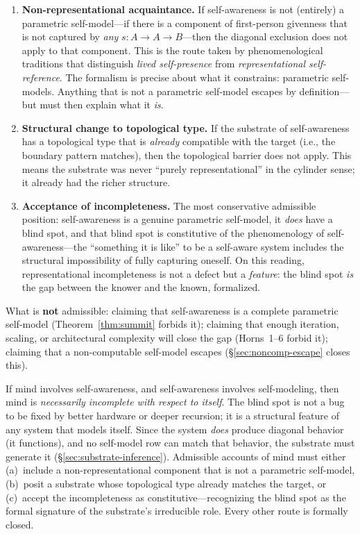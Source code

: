 \documentclass[11pt]{article}
\begin{document}
\begin{enumerate}[label=(\alph*),itemsep=0.3ex]
\item \textbf{Non-representational acquaintance.}
  If self-awareness is not (entirely) a parametric self-model---if
  there is a component of first-person givenness that is not captured
  by \emph{any} $s : A \to A \to B$---then the diagonal exclusion does
  not apply to that component.  This is the route taken by
  phenomenological traditions that distinguish \emph{lived
  self-presence} from \emph{representational self-reference}.  The
  formalism is precise about what it constrains: parametric
  self-models.  Anything that is not a parametric self-model escapes
  by definition---but must then explain what it \emph{is}.
\item \textbf{Structural change to topological type.}
  If the substrate of self-awareness has a topological type that is
  \emph{already} compatible with the target (i.e., the boundary
  pattern matches), then the topological barrier does not apply.  This
  means the substrate was never ``purely representational'' in the
  cylinder sense; it already had the richer structure.
\item \textbf{Acceptance of incompleteness.}
  The most conservative admissible position: self-awareness is a
  genuine parametric self-model, it \emph{does} have a blind spot, and
  that blind spot is constitutive of the phenomenology of
  self-awareness---the ``something it is like'' to be a self-aware
  system includes the structural impossibility of fully capturing
  oneself.  On this reading, representational incompleteness is not a
  defect but a \emph{feature}: the blind spot \emph{is} the gap
  between the knower and the known, formalized.
\end{enumerate}

\noindent
What is \textbf{not} admissible: claiming that self-awareness is a
complete parametric self-model (Theorem~\ref{thm:summit} forbids it);
claiming that enough iteration, scaling, or architectural complexity
will close the gap (Horns~1--6 forbid it); claiming that a
non-computable self-model escapes (\S\ref{sec:noncomp-escape} closes
this).

\begin{keybox}[title={What is mind, given the obstructions?}]
If mind involves self-awareness, and self-awareness involves
self-modeling, then mind is \emph{necessarily incomplete with respect
to itself}.  The blind spot is not a bug to be fixed by better
hardware or deeper recursion; it is a structural feature of any
system that models itself.  Since the system \emph{does} produce
diagonal behavior (it functions), and no self-model row can match
that behavior, the substrate must generate it
(\S\ref{sec:substrate-inference}).  Admissible accounts of mind
must either (a)~include a non-representational component that is
not a parametric self-model, (b)~posit a substrate whose topological
type already matches the target, or (c)~accept the incompleteness as
constitutive---recognizing the blind spot as the formal signature of
the substrate's irreducible role.  Every other route is formally
closed.
\end{keybox}
\end{document}
